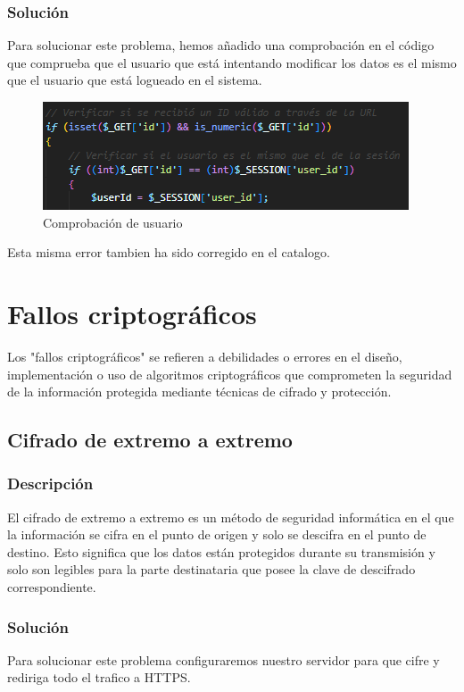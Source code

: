 \documentclass{report}
\begin{document}
                \subsubsection{Solución}
                    Para solucionar este problema, hemos añadido una comprobación en el código que comprueba que el usuario que está intentando modificar los datos es el mismo que el usuario que está logueado en el sistema.
                    \begin{figure}[H]
                        \centering
                        \includegraphics[width=\textwidth]{./img/vulnerabilidades/3.1/1.4.png}
                        \caption{Comprobación de usuario}
                    \end{figure}
                    Esta misma error tambien ha sido corregido en el catalogo.
            \clearpage       
        \section{Fallos criptográficos}
            Los "fallos criptográficos" se refieren a debilidades o errores en el diseño, implementación o uso de algoritmos criptográficos que comprometen la seguridad de la información protegida mediante técnicas de cifrado y protección.
            \subsection{Cifrado de extremo a extremo}
                \subsubsection{Descripción}
                El cifrado de extremo a extremo es un método de seguridad informática en el que la información se cifra en el punto de origen y solo se descifra en el punto de destino. Esto significa que los datos están protegidos durante su transmisión y solo son legibles para la parte destinataria que posee la clave de descifrado correspondiente.
                \subsubsection{Solución}
                    Para solucionar este problema configuraremos nuestro servidor para que cifre y rediriga todo el trafico a HTTPS.
                    
\end{document}
